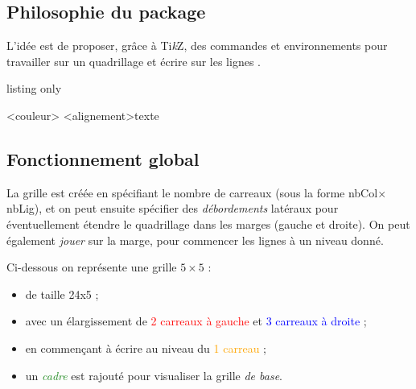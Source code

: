 \documentclass[a4paper]{article}
\providecommand\tikzlogo{Ti\textit{k}Z}
\let\TikZ\tikzlogo
\begin{document}
\subsection{\og Philosophie \fg{} du package}

L'idée est de proposer, grâce à \TikZ, des \textsf{commandes} et \textsf{environnements} pour travailler sur un quadrillage et écrire \og sur les lignes \fg.

\begin{PresentationCode}{listing only}

\begin{EnvQuadrillage}[clés]<couleur>
	\EcrireLigne[clés]<alignement>{texte}
	\PasseLigne
\end{EnvQuadrillage}
\end{PresentationCode}

\subsection{Fonctionnement global}

La grille est créée en spécifiant le nombre de carreaux (sous la forme nbCol$\times$nbLig), et on peut ensuite spécifier des \textit{débordements} latéraux pour éventuellement étendre le quadrillage dans les marges (gauche et droite). On peut également \textit{jouer} sur la marge, pour commencer les lignes à un niveau donné.

\medskip

Ci-dessous on représente une grille $5\times5$ :

\begin{itemize}
	\item de taille 24x5 ;
	\item avec un élargissement de \textcolor{red}{2 carreaux à gauche} et \textcolor{blue}{3 carreaux à droite} ;
	\item en commençant à écrire au niveau du \textcolor{orange}{1 carreau} ;
	\item un \textcolor{ForestGreen}{\textit{cadre}} est rajouté pour visualiser la grille \textit{de base}.
\end{itemize}

\medskip
\end{document}

